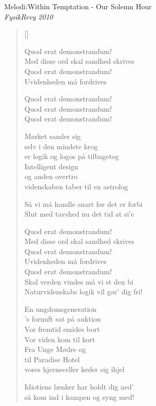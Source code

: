 \newpage



{Melodi:Within Temptation - Our Solemn Hour}\\[.2em]
{\small\itshape FysikRevy  2010}
\begin{multicols}{2}
\settowidth{\versewidth}{Med disse ord skal sandhed skrives (Sandhed skrives)}
\begin{verse}[\versewidth]

Quod erat demonstrandum!\\
Med disse ord skal sandhed skrives\\
Quod erat demonstrandum!\\
Uvidenheden må fordrives

Quod erat demonstrandum!\\
Quod erat demonstrandum!\\
Quod erat demonstrandum!

Mørket samler sig\\
selv i den mindste krog\\
er logik og logos på tilbagetog\\
Intelligent design\\
og anden overtro\\
videnskaben taber til en astrolog

Så vi må handle snart før det er forbi\\
Slut med tavshed nu det tid at si'e

Quod erat demonstrandum!\\
Med disse ord skal sandhed skrives\\
Quod erat demonstrandum!\\
Uvidenheden må fordrives\\
Quod erat demonstrandum!\\
Skal verden vindes må vi st den bi\\
Naturvidenskabs logik vil gør' dig fri!

En ungdomsgeneration\\
's fornuft sat på auktion\\
Vor fremtid smides bort\\
Vor viden kom til kort\\
Fra Unge Mødre og\\
til Paradise Hotel\\
vores hjerneceller keder sig ihjel

Idiotiens lænker har holdt dig ned'\\
så kom ind i kampen og syng med!


\end{verse}
\end{multicols}
